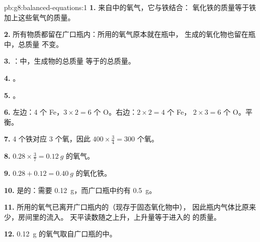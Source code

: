 \begin{solution}{pb:g8:balanced-equations:1}
\textbf{1.} 来自中的氧气，它与铁结合：
氧化铁的质量等于铁加上这些氧气的质量。

\textbf{2.} 所有物质都留在广口瓶内：所用的氧气原本就在瓶中，
生成的氧化物也留在瓶中，总质量
不变。

\textbf{3.} ：中，生成物的总质量
等于的总质量。

\textbf{4.} 。

\textbf{5.} 。

\textbf{6.} 左边：4 个 Fe，$3 \times 2 = 6$ 个 O。右边：$2 \times 2 = 4$ 个 Fe，
$2 \times 3 = 6$ 个 O。平衡。

\textbf{7.} 4 个铁对应 3 个氧，因此 $400 \times
\frac{3}{4} = 300$ 个氧。

\textbf{8.} $0.28 \times \frac{3}{7} = \qty{0.12}{g}$ 的氧气。

\textbf{9.} $0.28 + 0.12 = \qty{0.40}{g}$ 的氧化铁。

\textbf{10.} 是的：需要 \qty{0.12}{g}，而广口瓶中约有
\qty{0.5}{g}。

\textbf{11.} 所用的氧气已离开广口瓶内的（现存于固态氧化物中），
因此瓶内气体比原来少，房间里的流入。
天平读数随之上升，上升量等于进入的
的质量。

\textbf{12.} \qty{0.12}{g} 的氧气取自广口瓶的中。
\end{solution}

